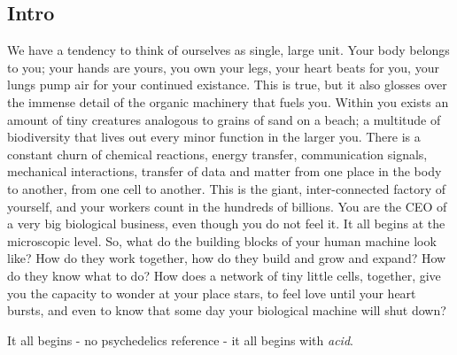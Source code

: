 \subsection{Intro}
We have a tendency to think of ourselves as single, large unit. Your body belongs to you; your hands are yours, you own your legs, your heart beats for you, your lungs pump air for your continued existance. This is true, but it also glosses over the immense detail of the organic machinery that fuels you. Within you exists an amount of tiny creatures analogous to grains of sand on a beach; a multitude of biodiversity that lives out every minor function in the larger you. There is a constant churn of chemical reactions, energy transfer, communication signals, mechanical interactions, transfer of data and matter from one place in the body to another, from one cell to another. This is the giant, inter-connected factory of yourself, and your workers count in the hundreds of billions. You are the CEO of a very big biological business, even though you do not feel it.
It all begins at the microscopic level. So, what do the building blocks of your human machine look like? How do they work together, how do they build and grow and expand? How do they know what to do? How does a network of tiny little cells, together, give you the capacity to wonder at your place stars, to feel love until your heart bursts, and even to know that some day your biological machine will shut down?

It all begins - no psychedelics reference - it all begins with \emph{acid}. 